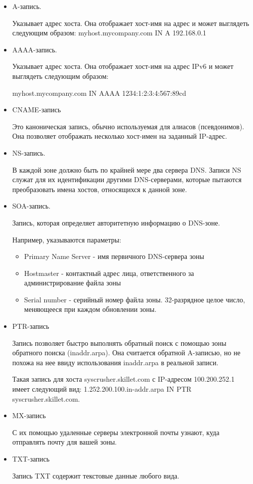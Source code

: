 \documentclass[a4paper,12pt]{article}
\begin{document}
	\begin{itemize}
		\item A-запись.
		
		Указывает адрес хоста. Она отображает хост-имя на адрес и может выглядеть следующим образом: myhost.mycompany.com IN A 192.168.0.1
		\item AAAA-запись.
		
		Указывает адрес хоста. Она отображает хост-имя на адрес IPv6 и может выглядеть следующим образом:
		
		myhost.mycompany.com IN AAAA 1234:1:2:3:4:567:89cd
		\item CNAME-запись
		
		Это каноническая запись, обычно используемая для алиасов (псевдонимов). Она позволяет отображать несколько хост-имен на заданный IP-адрес.
		\item NS-запись.
		
		В каждой зоне должно быть по крайней мере два сервера DNS. Записи NS служат для их идентификации другими DNS-серверами, которые пытаются преобразовать имена хостов, относящихся к данной зоне.
		\item SOA-запись.
		
		Запись, которая определяет авторитетную информацию о DNS-зоне.
		
		Например, указываются параметры:
		\begin{itemize}
			\item Primary Name Server - имя первичного DNS-сервера зоны
			\item Hostmaster - контактный адрес лица, ответственного за администрирование файла зоны
			\item Serial number - серийный номер файла зоны. 32-разрядное целое число, меняющееся при каждом обновлении зоны.
		\end{itemize}
		\item PTR-запись
		
		Запись позволяет быстро выполнять обратный поиск с помощью зоны обратного поиска (inaddr.arpa). Она считается обратной A-записью, но не похожа на нее ввиду использования inaddr.arpa в реальной записи.
		
		Такая запись для хоста syscrusher.skillet.com с IP-адресом 100.200.252.1 имеет следующий вид: 1.252.200.100.in-addr.arpa IN PTR syscrusher.skillet.com.
		\item MX-запись
		
		С их помощью удаленные серверы электронной почты узнают, куда отправлять почту для вашей зоны.
		\item TXT-запись
		
		Запись TXT содержит текстовые данные любого вида.
	\end{itemize}
	
\end{document}
